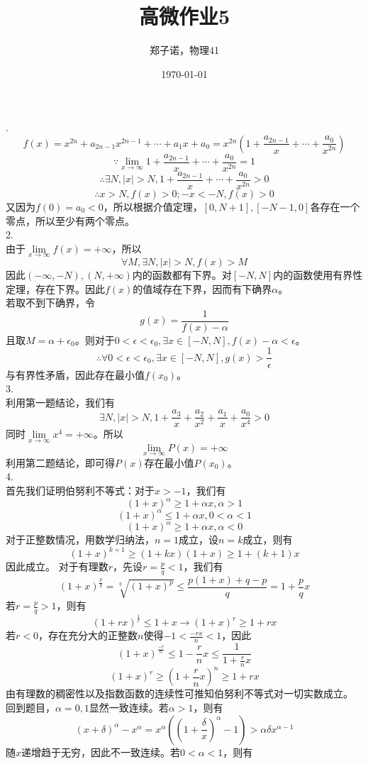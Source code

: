 \documentclass[utf8]{ctexart}
\title{高微作业5}
\author{郑子诺，物理41}
\date{\today}
\begin{document}
\maketitle
{}.\\
\[f(x)=x^{2n}+a_{2n-1}x^{2n-1}+\cdots+a_1x+a_0=x^{2n}(1+\frac{a_{2n-1}}{x}+\cdots+\frac{a_0}{x^{2n}})\]
\[\because\lim\limits_{x\rightarrow\infty}1+\frac{a_{2n-1}}{x}+\cdots+\frac{a_0}{x^{2n}}=1\]
\[\therefore\exists N,|x|>N,1+\frac{a_{2n-1}}{x}+\cdots+\frac{a_0}{x^{2n}}>0\]
\[\therefore x>N,f(x)>0;-x<-N,f(x)>0\]
又因为$f(0)=a_0<0$，所以根据介值定理，$[0,N+1],[-N-1,0]$各存在一个零点，所以至少有两个零点。\\
2.\\
由于$\lim\limits_{x\rightarrow\infty}f(x)=+\infty$，所以
\[\forall M,\exists N,|x|>N,f(x)>M\]
因此$(-\infty,-N),(N,+\infty)$内的函数都有下界。对$[-N,N]$内的函数使用有界性定理，存在下界。因此$f(x)$的值域存在下界，因而有下确界$\alpha$。\\
若取不到下确界，令
\[g(x)=\frac{1}{f(x)-\alpha}\]
且取$M=\alpha+\epsilon_0$。则对于$0<\epsilon<\epsilon_0,\exists x\in[-N,N],f(x)-\alpha<\epsilon$。
\[\therefore\forall0<\epsilon<\epsilon_0,\exists x\in[-N,N],g(x)>\frac{1}{\epsilon}\]
与有界性矛盾，因此存在最小值$f(x_0)$。\\
3.\\
利用第一题结论，我们有
\[\exists N,|x|>N,1+\frac{a_3}{x}+\frac{a_2}{x^2}+\frac{a_1}{x}+\frac{a_0}{x^4}>0\]
同时$\lim\limits_{x\rightarrow\infty}x^4=+\infty$。所以
\[\lim\limits_{x\rightarrow\infty}P(x)=+\infty\]
利用第二题结论，即可得$P(x)$存在最小值$P(x_0)$。\\
4.\\
首先我们证明伯努利不等式：对于$x>-1$，我们有
\[(1+x)^\alpha\ge1+\alpha x,\alpha>1\]
\[(1+x)^\alpha\le1+\alpha x,0<\alpha<1\]
\[(1+x)^\alpha\ge1+\alpha x,\alpha<0\]
对于正整数情况，用数学归纳法，$n=1$成立，设$n=k$成立，则有
\[(1+x)^{k+1}\ge(1+kx)(1+x)\ge1+(k+1)x\]
因此成立。
对于有理数$r$，先设$r=\frac{p}{q}<1$，我们有
\[(1+x)^\frac{p}{q}=\sqrt[q]{(1+x)^p}\le\frac{p(1+x)+q-p}{q}=1+\frac{p}{q}x\]
若$r=\frac{p}{q}>1$，则有
\[(1+rx)^\frac{1}{r}\le1+x\rightarrow(1+x)^r\ge1+rx\]
若$r<0$，存在充分大的正整数$n$使得$-1<\frac{-rx}{n}<1$，因此
\[(1+x)^\frac{-r}{n}\le1-\frac{r}{n}x\le\frac{1}{1+\frac{r}{n}x}\]
\[(1+x)^r\ge(1+\frac{r}{n}x)^n\ge1+rx\]
由有理数的稠密性以及指数函数的连续性可推知伯努利不等式对一切实数成立。
回到题目，$\alpha=0,1$显然一致连续。若$\alpha>1$，则有
\[(x+\delta)^\alpha-x^\alpha=x^\alpha((1+\frac{\delta}{x})^\alpha-1)>\alpha\delta x^{\alpha-1}\]
随$x$递增趋于无穷，因此不一致连续。若$0<\alpha<1$，则有
\end{document}

